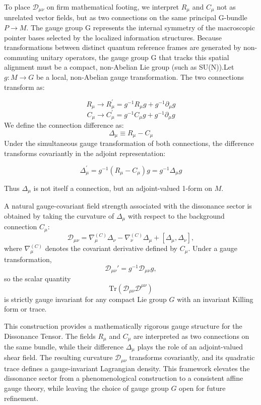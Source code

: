 \documentclass[12pt,openany]{book}
\theoremstyle{plain}
\theoremstyle{definition}
\theoremstyle{remark}
\begin{document}
To place $\mathcal{D}_{\mu\nu}$ on firm mathematical footing, we interpret $R_{\mu}$ and $C_{\mu}$ not as unrelated vector fields, but as two connections on the same principal G-bundle $P\rightarrow M$. The gauge group G represents the internal symmetry of the macroscopic pointer bases selected by the localized information structures. Because transformations between distinct quantum reference frames are generated by non-commuting unitary operators, the gauge group G that tracks this spatial alignment must be a compact, non-Abelian Lie group (such as SU(N)).Let $g:M\rightarrow G$ be a local, non-Abelian gauge transformation. The two connections transform as:

$$R_{\mu}\rightarrow R_{\mu}^{\prime}=g^{-1}R_{\mu}g+g^{-1}\partial_{\mu}g$$$$C_{\mu}\rightarrow C_{\mu}^{\prime}=g^{-1}C_{\mu}g+g^{-1}\partial_{\mu}g$$We define the connection difference as:$$\Delta_{\mu}\equiv R_{\mu}-C_{\mu}$$Under the simultaneous gauge transformation of both connections, the difference transforms covariantly in the adjoint representation:

$$\Delta_{\mu}^{\prime}=g^{-1}(R_{\mu}-C_{\mu})g=g^{-1}\Delta_{\mu}g$$


Thus $\Delta_\mu$ is not itself a connection, but an adjoint-valued
1-form on $M$.

A natural gauge-covariant field strength associated with the dissonance
sector is obtained by taking the curvature of $\Delta_\mu$ with respect to
the background connection $C_\mu$:
\[
\mathcal{D}_{\mu\nu}
= \nabla_\mu^{(C)} \Delta_\nu
- \nabla_\nu^{(C)} \Delta_\mu
+ [\Delta_\mu, \Delta_\nu],
\]
where $\nabla_\mu^{(C)}$ denotes the covariant derivative defined by $C_\mu$.
Under a gauge transformation,
\[
\mathcal{D}_{\mu\nu}' = g^{-1} \mathcal{D}_{\mu\nu} g,
\]
so the scalar quantity
\[
\mathrm{Tr}(\mathcal{D}_{\mu\nu} \mathcal{D}^{\mu\nu})
\]
is strictly gauge invariant for any compact Lie group $G$ with an invariant
Killing form or trace.

This construction provides a mathematically rigorous gauge structure for the
Dissonance Tensor. The fields $R_\mu$ and $C_\mu$ are interpreted as two
connections on the same bundle, while their difference $\Delta_\mu$ plays
the role of an adjoint-valued shear field. The resulting curvature
$\mathcal{D}_{\mu\nu}$ transforms covariantly, and its quadratic trace
defines a gauge-invariant Lagrangian density. This framework elevates the
dissonance sector from a phenomenological construction to a consistent
affine gauge theory, while leaving the choice of gauge group $G$ open for
future refinement.
\end{document}
